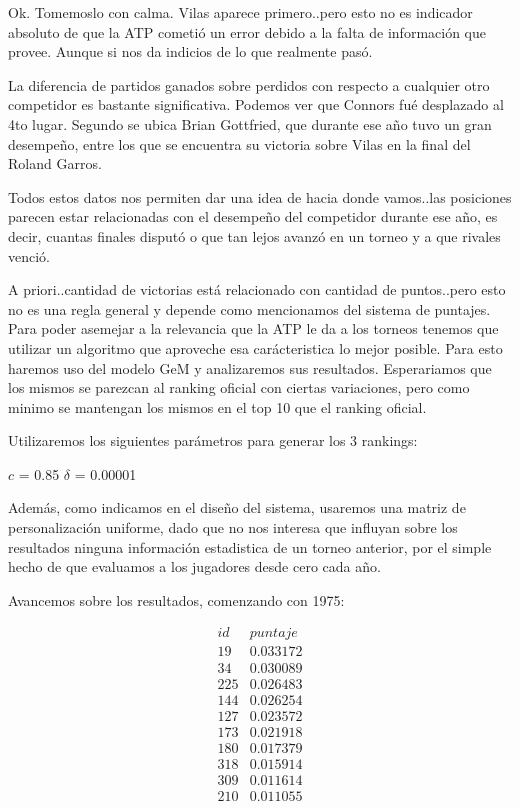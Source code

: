 Ok. Tomemoslo con calma. Vilas aparece primero..pero esto no es indicador absoluto de que la ATP cometió un error debido a la falta de información que provee. Aunque si nos da indicios de lo que realmente pasó.

La diferencia de partidos ganados sobre perdidos con respecto a cualquier otro competidor es bastante significativa. Podemos ver que Connors fué desplazado al 4to lugar. Segundo se ubica Brian Gottfried, que durante ese año tuvo un gran desempeño, entre los que se encuentra su victoria sobre Vilas en la final del Roland Garros. 

Todos estos datos nos permiten dar una idea de hacia donde vamos..las posiciones parecen estar relacionadas con el desempeño del competidor durante ese año, es decir, cuantas finales disputó o que tan lejos avanzó en un torneo y a que rivales venció.

A priori..cantidad de victorias está relacionado con cantidad de puntos..pero esto no es una regla general y depende como mencionamos del sistema de puntajes. Para poder asemejar a la relevancia que la ATP le da a los torneos tenemos que utilizar un algoritmo que aproveche esa carácteristica lo mejor posible. Para esto haremos uso del modelo GeM y analizaremos sus resultados. Esperariamos que los mismos se parezcan al ranking oficial con ciertas variaciones, pero como minimo se mantengan los mismos en el top 10 que el ranking oficial. 

Utilizaremos los siguientes parámetros para generar los 3 rankings:

$c$ = 0.85
$\delta$ = 0.00001

Además, como indicamos en el diseño del sistema, usaremos una matriz de personalización uniforme, dado que no nos interesa que influyan sobre los resultados ninguna información estadistica de un torneo anterior, por el simple hecho de que evaluamos a los jugadores desde cero cada año.

Avancemos sobre los resultados, comenzando con 1975:

\begin{eqnarray*}
id & puntaje \\
19 & 0.033172 \\
34 & 0.030089 \\
225 & 0.026483 \\
144 & 0.026254 \\
127 & 0.023572 \\
173 & 0.021918 \\
180 & 0.017379 \\
318 & 0.015914 \\
309 & 0.011614 \\
210 & 0.011055 \\
\end{eqnarray*}

